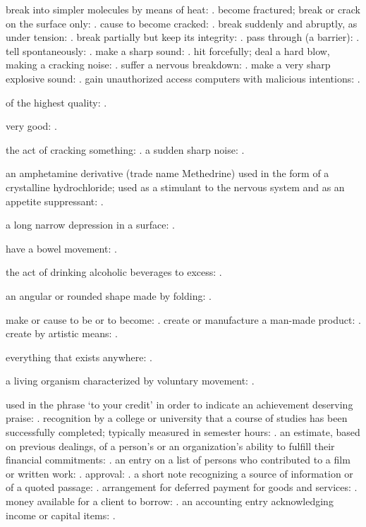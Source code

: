  break into simpler molecules by means of heat: . become fractured; break or crack on the surface only: . cause to become cracked: . break suddenly and abruptly, as under tension: . break partially but keep its integrity: . pass through (a barrier): . tell spontaneously: . make a sharp sound: . hit forcefully; deal a hard blow, making a cracking noise: . suffer a nervous breakdown: . make a very sharp explosive sound: . gain unauthorized access computers with malicious intentions: .

  of the highest quality: .

  very good: .

  the act of cracking something: . a sudden sharp noise: .

  an amphetamine derivative (trade name Methedrine) used in the form of a crystalline hydrochloride; used as a stimulant to the nervous system and as an appetite suppressant: .

  a long narrow depression in a surface: .

  have a bowel movement: .

  the act of drinking alcoholic beverages to excess: .

  an angular or rounded shape made by folding: .

  make or cause to be or to become: . create or manufacture a man-made product: . create by artistic means: .

  everything that exists anywhere: .

  a living organism characterized by voluntary movement: .

  used in the phrase `to your credit' in order to indicate an achievement deserving praise: . recognition by a college or university that a course of studies has been successfully completed; typically measured in semester hours: . an estimate, based on previous dealings, of a person's or an organization's ability to fulfill their financial commitments: . an entry on a list of persons who contributed to a film or written work: . approval: . a short note recognizing a source of information or of a quoted passage: . arrangement for deferred payment for goods and services: . money available for a client to borrow: . an accounting entry acknowledging income or capital items: .

